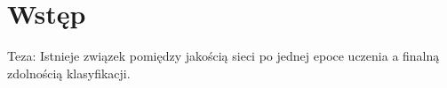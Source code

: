\chapter{Wstęp}
Teza: Istnieje związek pomiędzy jakością sieci po jednej epoce uczenia a finalną zdolnością klasyfikacji.
